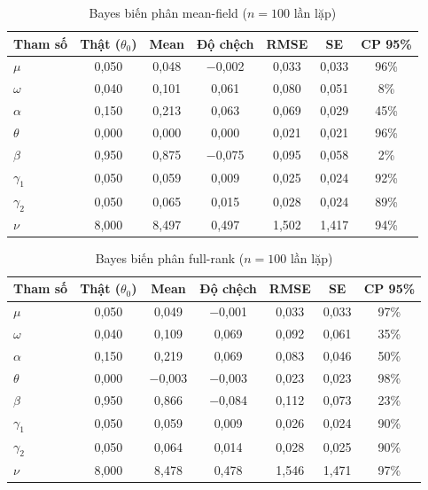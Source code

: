 \documentclass[11pt,a4paper]{article}
\begin{document}
\begin{table}[H]\centering\scriptsize
\caption{Bayes biến phân mean-field ($n=100$ lần lặp)}
\begin{tabularx}{\textwidth}{l C C C C C C}
\toprule
\textbf{Tham số} & \textbf{Thật ($\theta_0$)} & \textbf{Mean} & \textbf{Độ chệch} & \textbf{RMSE} & \textbf{SE} & \textbf{CP 95\%} \\
\midrule
$\mu$ & 0,050 & 0,048 & $-$0,002 & 0,033 & 0,033 & 96\% \\
$\omega$ & 0,040 & 0,101 & 0,061 & 0,080 & 0,051 & 8\% \\
$\alpha$ & 0,150 & 0,213 & 0,063 & 0,069 & 0,029 & 45\% \\
$\theta$ & 0,000 & 0,000 & 0,000 & 0,021 & 0,021 & 96\% \\
$\beta$ & 0,950 & 0,875 & $-$0,075 & 0,095 & 0,058 & 2\% \\
$\gamma_1$ & 0,050 & 0,059 & 0,009 & 0,025 & 0,024 & 92\% \\
$\gamma_2$ & 0,050 & 0,065 & 0,015 & 0,028 & 0,024 & 89\% \\
$\nu$ & 8,000 & 8,497 & 0,497 & 1,502 & 1,417 & 94\% \\
\bottomrule
\end{tabularx}
\end{table}

\begin{table}[H]\centering\scriptsize
\caption{Bayes biến phân full-rank ($n=100$ lần lặp)}
\begin{tabularx}{\textwidth}{l C C C C C C}
\toprule
\textbf{Tham số} & \textbf{Thật ($\theta_0$)} & \textbf{Mean} & \textbf{Độ chệch} & \textbf{RMSE} & \textbf{SE} & \textbf{CP 95\%} \\
\midrule
$\mu$ & 0,050 & 0,049 & $-$0,001 & 0,033 & 0,033 & 97\% \\
$\omega$ & 0,040 & 0,109 & 0,069 & 0,092 & 0,061 & 35\% \\
$\alpha$ & 0,150 & 0,219 & 0,069 & 0,083 & 0,046 & 50\% \\
$\theta$ & 0,000 & $-$0,003 & $-$0,003 & 0,023 & 0,023 & 98\% \\
$\beta$ & 0,950 & 0,866 & $-$0,084 & 0,112 & 0,073 & 23\% \\
$\gamma_1$ & 0,050 & 0,059 & 0,009 & 0,026 & 0,024 & 90\% \\
$\gamma_2$ & 0,050 & 0,064 & 0,014 & 0,028 & 0,025 & 90\% \\
$\nu$ & 8,000 & 8,478 & 0,478 & 1,546 & 1,471 & 97\% \\
\bottomrule
\end{tabularx}
\end{table}
\end{document}

